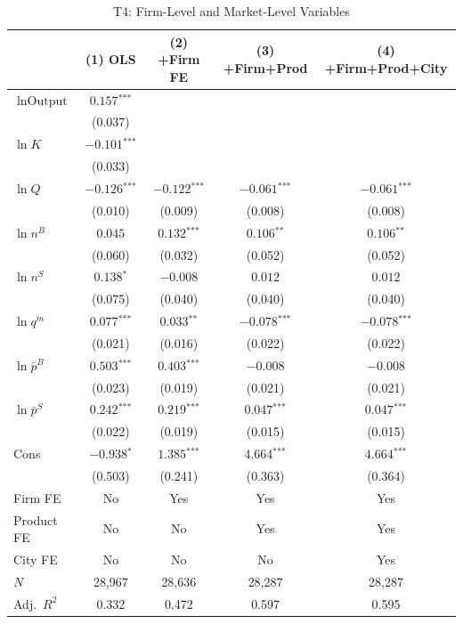 \documentclass[12pt]{article}
\newcommand{\sym}[1]{\ensuremath{^{\text{#1}}}}
\newcommand{\se}[1]{{\small(#1)}}
\newcommand{\abs}{\textemdash}
\begin{document}
\begin{table}[H]
  \centering
  \caption{T4: Firm-Level and Market-Level Variables}
  \label{tab:t4}
  \begin{threeparttable}
    \begin{tabular}{lcccc}
      \toprule
      & (1) OLS & (2) +Firm FE & (3) +Firm+Prod & (4) +Firm+Prod+City \\
      \midrule
      \(\ln \text{Output}\) & \(0.157\sym{***}\) & \abs & \abs & \abs \\
                             & \se{0.037} & & & \\[4pt]
      \(\ln K\) & \(-0.101\sym{***}\) & \abs & \abs & \abs \\
                & \se{0.033} & & & \\[4pt]
      \(\ln Q\) & \(-0.126\sym{***}\) & \(-0.122\sym{***}\) & \(-0.061\sym{***}\) & \(-0.061\sym{***}\) \\
                & \se{0.010} & \se{0.009} & \se{0.008} & \se{0.008} \\[4pt]
      \(\ln n^{B}\) & \(0.045\) & \(0.132\sym{***}\) & \(0.106\sym{**}\) & \(0.106\sym{**}\) \\
                    & \se{0.060} & \se{0.032} & \se{0.052} & \se{0.052} \\[4pt]
      \(\ln n^{S}\) & \(0.138\sym{*}\) & \(-0.008\) & \(0.012\) & \(0.012\) \\
                    & \se{0.075} & \se{0.040} & \se{0.040} & \se{0.040} \\[4pt]
      \(\ln q^{m}\) & \(0.077\sym{***}\) & \(0.033\sym{**}\) & \(-0.078\sym{***}\) & \(-0.078\sym{***}\) \\
                    & \se{0.021} & \se{0.016} & \se{0.022} & \se{0.022} \\[4pt]
      \(\ln \bar{p}^{B}\) & \(0.503\sym{***}\) & \(0.403\sym{***}\) & \(-0.008\) & \(-0.008\) \\
                          & \se{0.023} & \se{0.019} & \se{0.021} & \se{0.021} \\[4pt]
      \(\ln \bar{p}^{S}\) & \(0.242\sym{***}\) & \(0.219\sym{***}\) & \(0.047\sym{***}\) & \(0.047\sym{***}\) \\
                          & \se{0.022} & \se{0.019} & \se{0.015} & \se{0.015} \\[4pt]
      Cons & \(-0.938\sym{*}\) & \(1.385\sym{***}\) & \(4.664\sym{***}\) & \(4.664\sym{***}\) \\
               & \se{0.503} & \se{0.241} & \se{0.363} & \se{0.364} \\
      \midrule
      Firm FE    & No  & Yes & Yes & Yes \\
      Product FE & No  & No  & Yes & Yes \\
      City FE    & No  & No  & No  & Yes \\
      \(N\)      & 28,967 & 28,636 & 28,287 & 28,287 \\
      Adj.\ \(R^2\) & 0.332 & 0.472 & 0.597 & 0.595 \\
      \bottomrule
    \end{tabular}
  \end{threeparttable}
\end{table}
\end{document}
